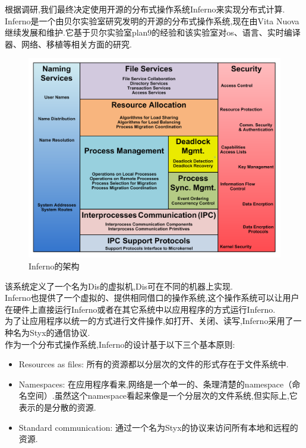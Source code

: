 \documentclass[paper=a4]{ctexart} %
\numberwithin{equation}{section} %
\numberwithin{figure}{section} %
\numberwithin{table}{section} %
\newcommand{\n}{\\\indent}
\begin{document}
根据调研,我们最终决定使用开源的分布式操作系统Inferno来实现分布式计算.\n
Inferno是一个由贝尔实验室研究发明的开源的分布式操作系统,现在由Vita Nuova继续发展和维护.它基于贝尔实验室plan9的经验和该实验室对os、语言、实时编译器、网络、移植等相关方面的研究.\n
\begin{figure}[htbp]
\centering
\includegraphics[width=4.8in,height=3.5in]{pic/inferno.png}
\caption{Inferno的架构}
\end{figure}
该系统定义了一个名为Dis的虚拟机,Dis可在不同的机器上实现.\n
Inferno也提供了一个虚拟的、提供相同借口的操作系统,这个操作系统可以让用户在硬件上直接运行Inferno或者在其它系统中以应用程序的方式运行Inferno. \n
为了让应用程序以统一的方式进行文件操作,如打开、关闭、读写,Inferno采用了一种名为Styx的通信协议.\n
作为一个分布式操作系统,Inferno的设计基于以下三个基本原则:
\begin{itemize}
\item Resources as files: 所有的资源都以分层次的文件的形式存在于文件系统中.
\item Namespaces: 在应用程序看来,网络是一个单一的、条理清楚的namespace（命名空间）.虽然这个namespace看起来像是一个分层次的文件系统,但实际上,它表示的是分散的资源.
\item Standard communication: 通过一个名为Styx的协议来访问所有本地和远程的资源.
\end{itemize}
\end{document}
